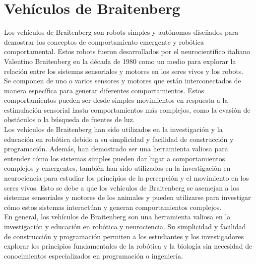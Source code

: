 \documentclass[oneside,onecolumn]{article}
\begin{document}
\newpage
\section{Vehículos de Braitenberg}

Los vehículos de Braitenberg son robots simples y autónomos diseñados para demostrar los conceptos de comportamiento emergente y robótica comportamental. Estos robots fueron desarrollados por el neurocientífico italiano Valentino Braitenberg en la década de 1980 como un medio para explorar la relación entre los sistemas sensoriales y motores en los seres vivos y los robots.\\

Se componen de uno o varios sensores y motores que están interconectados de manera específica para generar diferentes comportamientos. Estos comportamientos pueden ser desde simples movimientos en respuesta a la estimulación sensorial hasta comportamientos más complejos, como la evasión de obstáculos o la búsqueda de fuentes de luz.\\

Los vehículos de Braitenberg han sido utilizados en la investigación y la educación en robótica debido a su simplicidad y facilidad de construcción y programación. Además, han demostrado ser una herramienta valiosa para entender cómo los sistemas simples pueden dar lugar a comportamientos complejos y emergentes, también han sido utilizados en la investigación en neurociencia para estudiar los principios de la percepción y el movimiento en los seres vivos. Esto se debe a que los vehículos de Braitenberg se asemejan a los sistemas sensoriales y motores de los animales y pueden utilizarse para investigar cómo estos sistemas interactúan y generan comportamientos complejos.\\

En general, los vehículos de Braitenberg son una herramienta valiosa en la investigación y educación en robótica y neurociencia. Su simplicidad y facilidad de construcción y programación permiten a los estudiantes y los investigadores explorar los principios fundamentales de la robótica y la biología sin necesidad de conocimientos especializados en programación o ingeniería.\\
\end{document}
